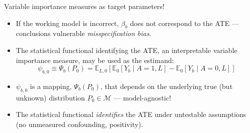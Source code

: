 \documentclass{beamer}
\begin{document}
\begin{frame}[c]{Variable importance measures as target parameters!}

\begin{center}
\begin{itemize}
  \itemsep6pt
  \item If the working model is incorrect, $\beta_b$ does not correspond to the
    ATE --- conclusions vulnerable \textit{misspecification bias}.
  \item The statistical functional identifying the ATE, an interpretable
    variable importance measure, may be used as the estimand:
    $$ \psi_{b,0} \equiv \Psi_b(P_0) = \mathbb{E}_{L,0}[\mathbb{E}_0[Y_b \mid
    A = 1, L] - \mathbb{E}_0[Y_b \mid A = 0, L]] $$
  \item $\psi_{b,0}$ is a mapping, $\Psi_b(P_0)$, that depends on the underlying
    true (but unknown) distribution $P_0 \in \mathcal{M}$ --- model-agnostic!
  \item The statistical functional \textit{identifies} the ATE under untestable
    assumptions (no unmeasured confounding, positivity).
\end{itemize}
\end{center}

\end{frame}

\end{document}
